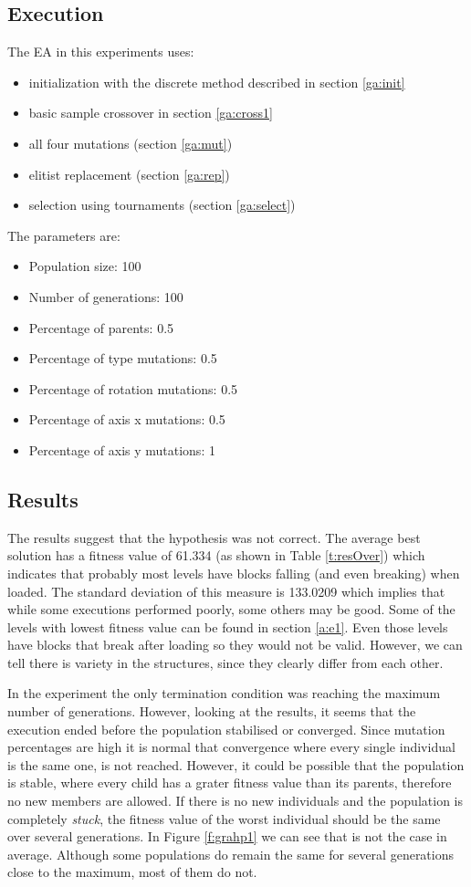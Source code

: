 \subsection{Execution}
The \acs{EA} in this experiments uses:
\begin{itemize}
	\item  initialization with the discrete method described in section \ref{ga:init}
	\item  basic sample crossover in section \ref{ga:cross1}
	\item  all four mutations (section \ref{ga:mut})
	\item  elitist replacement (section \ref{ga:rep})
	\item  selection using tournaments (section \ref{ga:select})
\end{itemize}

The parameters are:
\begin{itemize}
	\item Population size: 100
	\item Number of generations: 100
	\item Percentage of parents: 0.5
	\item Percentage of type mutations: 0.5
	\item Percentage of rotation mutations: 0.5
	\item Percentage of axis x mutations: 0.5
	\item Percentage of axis y mutations: 1
\end{itemize}
\subsection{Results}
The results suggest that the hypothesis was not correct. The average best solution has a fitness value of 61.334 (as shown in Table \ref{t:resOver}) which indicates that probably most levels have blocks falling (and even breaking) when loaded. The standard deviation of this measure is 133.0209 which implies that while some executions performed poorly, some others may be good. Some of the levels with lowest fitness value can be found in section \ref{a:e1}. Even those levels have blocks that break after loading so they would not be valid. However, we can tell there is variety in the structures, since they clearly differ from each other. 

In the experiment the only termination condition was reaching the maximum number of generations. However, looking at the results, it seems that the execution ended before the population stabilised or converged. Since mutation percentages are high it is normal that convergence where every single individual is the same one, is not reached. However, it could be possible that the population is stable, where every child has a grater fitness value than its parents, therefore no new members are allowed. If there is no new individuals and the population is completely \textit{stuck}, the fitness value of the worst individual should be the same over several generations. In Figure \ref{f:grahp1} we can see that is not the case in average. Although some populations do remain the same for several generations close to the maximum, most of them do not. 

